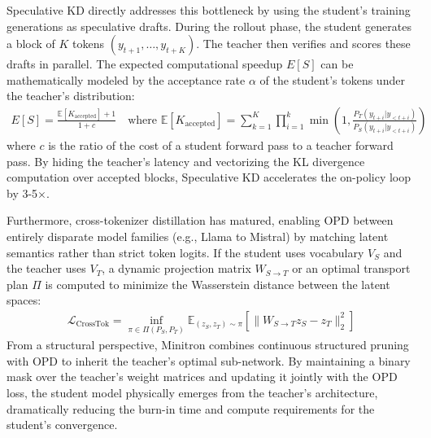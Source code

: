 Speculative KD \citep{2410.11325, 2510.24021} directly addresses this bottleneck by using the student's training generations as speculative drafts. During the rollout phase, the student generates a block of $K$ tokens $(y_{t+1}, \dots, y_{t+K})$. The teacher then verifies and scores these drafts in parallel. The expected computational speedup $E[S]$ can be mathematically modeled by the acceptance rate $\alpha$ of the student's tokens under the teacher's distribution:
\begin{align}
E[S] = \frac{\mathbb{E}[K_{\text{accepted}}] + 1}{1 + c} \quad \text{where } \mathbb{E}[K_{\text{accepted}}] = \sum_{k=1}^K \prod_{i=1}^k \min \left(1, \frac{P_T(y_{t+i} | y_{<t+i})}{P_S(y_{t+i} | y_{<t+i})} \right)
\end{align}
where $c$ is the ratio of the cost of a student forward pass to a teacher forward pass. By hiding the teacher's latency and vectorizing the KL divergence computation over accepted blocks, Speculative KD accelerates the on-policy loop by 3-5$\times$.

Furthermore, cross-tokenizer distillation \citep{2402.12030, 2310.13332} has matured, enabling OPD between entirely disparate model families (e.g., Llama to Mistral) by matching latent semantics rather than strict token logits. If the student uses vocabulary $V_S$ and the teacher uses $V_T$, a dynamic projection matrix $W_{S \to T}$ or an optimal transport plan $\Pi$ is computed to minimize the Wasserstein distance between the latent spaces:
\begin{align}
\mathcal{L}_{\text{CrossTok}} = \inf_{\pi \in \Pi(P_S, P_T)} \mathbb{E}_{(z_S, z_T) \sim \pi} \left[ \parallel W_{S \to T} z_S - z_T \parallel_2^2 \right]
\end{align}
From a structural perspective, Minitron \citep{2311.09829} combines continuous structured pruning with OPD to inherit the teacher's optimal sub-network. By maintaining a binary mask over the teacher's weight matrices and updating it jointly with the OPD loss, the student model physically emerges from the teacher's architecture, dramatically reducing the burn-in time and compute requirements for the student's convergence.


